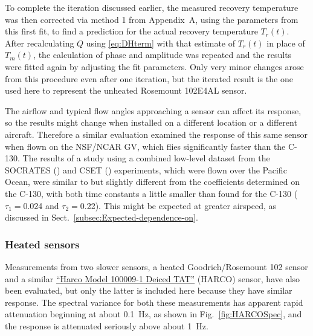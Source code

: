 \documentclass[11pt,twoside,american,12pt,twoside,american]{article}\usepackage[]{graphicx}\usepackage[]{color}
\begin{document}
To complete the iteration discussed earlier, the measured recovery
temperature was then corrected via method 1 from Appendix~A, using
the parameters from this first fit, to find a prediction for the actual
recovery temperature $T_{r}(t)$. After recalculating $Q$ using \eqref{eq:DHterm}
with that estimate of $T_{r}(t)$ in place of $T_{m}(t)$, the calculation
of phase and amplitude was repeated and the results were fitted again
by adjusting the fit parameters. Only very minor changes arose from
this procedure even after one iteration, but the iterated result is
the one used here to represent the unheated Rosemount 102E4AL sensor.





The airflow and typical flow angles approaching a sensor can affect
its response, so the results might change when installed on a different
location or a different aircraft. Therefore a similar evaluation examined
the response of this same sensor when flown on the NSF/NCAR GV, which
flies significantly faster than the C-130. The results of a study
using a combined low-level dataset from the SOCRATES (\citet{mcfarquhar2014southern})
and CSET (\citet{albrecht2019cloud}) experiments, which were flown
over the Pacific Ocean, were similar to but slightly different from
the coefficients determined on the C-130, with both time constants
a little smaller than found for the C-130 ($\tau_{1}=$0.024
and $\tau_{2}=$0.22). This might be expected
at greater airspeed, as discussed in Sect.~\ref{subsec:Expected-dependence-on}.


\subsubsection{Heated sensors\label{subsec:Heated-sensors}}



Measurements from two slower sensors, a heated Goodrich/Rosemount
102 sensor and a similar \href{https://www.eol.ucar.edu/instruments/heated-ambient-temperature-sensor}{\textquotedblleft Harco Model 100009-1 Deiced TAT\textquotedblright}
(HARCO) sensor, have also been evaluated, but only the latter is included
here because they have similar response. The spectral variance for
both these measurements has apparent rapid attenuation beginning at
about 0.1~Hz, as shown in Fig.~\ref{fig:HARCOSpec}, and the response
is attenuated seriously above about 1~Hz.
\end{document}
